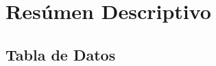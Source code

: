 \documentclass[12pt,a4paper,]{book}
\title{}
\author{Nombre Completo Autor}
\date{06/02/2024}
\def\ifdoblecara{} %
\def\ifprincipal{} %
\let\ifprincipal\undefined %
\numberwithin{dummy}{section}
\theoremstyle{ocrenumbox}
\theoremstyle{ocrenumbox}
\theoremstyle{ocrenumbox}
\theoremstyle{ocrenumbox}
\theoremstyle{ocrenum}
\begin{document}
\raggedbottom

\ifdefined\ifprincipal
\else
\setlength{\parindent}{1em}
\pagestyle{fancy}
\setcounter{tocdepth}{4}
\tableofcontents

\fi

\ifdefined\ifdoblecara
\fancyhead{}{}
\fancyhead[LE,RO]{\scriptsize\rightmark}
\fancyfoot[LO,RE]{\scriptsize\slshape \leftmark}
\fancyfoot[C]{}
\fancyfoot[LE,RO]{\footnotesize\thepage}
\else
\fancyhead{}{}
\fancyhead[RO]{\scriptsize\rightmark}
\fancyfoot[LO]{\scriptsize\slshape \leftmark}
\fancyfoot[C]{}
\fancyfoot[RO]{\footnotesize\thepage}
\fi
\renewcommand{\headrulewidth}{0.4pt}
\renewcommand{\footrulewidth}{0.4pt}

\hypertarget{resuxfamen-descriptivo}{%
\chapter{Resúmen Descriptivo}\label{resuxfamen-descriptivo}}

\hypertarget{tabla-de-datos}{%
\section{Tabla de Datos}\label{tabla-de-datos}}

\begingroup\fontsize{8}{10}\selectfont
\end{document}
